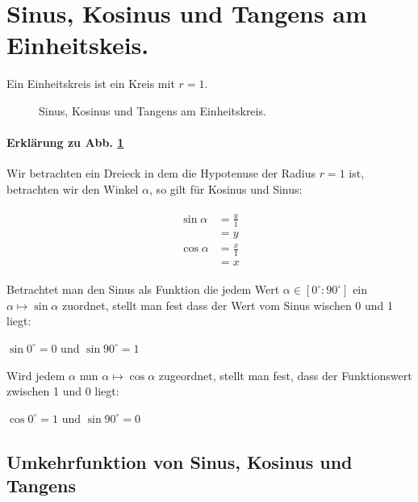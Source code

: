 \documentclass{report}
\theoremstyle{definition}
\theoremstyle{definition}
\theoremstyle{an}
\theoremstyle{lem}
\theoremstyle{def}
\theoremstyle{def}
\begin{document}
\section{Sinus, Kosinus und Tangens am Einheitskeis.}

\begin{defi}[Einheitskreis]
Ein Einheitskreis ist ein Kreis mit $r = 1$.
\end{defi}

\begin{figure}[h]
    \centering
    
    \caption{Sinus, Kosinus und Tangens am Einheitskreis.}
    \label{fig:62}
\end{figure}

\paragraph{\textsf{Erklärung zu Abb. \ref{fig:62}}}
Wir betrachten ein Dreieck in dem die Hypotenuse der Radius $r=1$ ist, betrachten wir den Winkel $\alpha$, so gilt für Kosinus und Sinus:

\begin{align}
    \begin{aligned}
    \sin \alpha &= \frac y1 \\ &= y \\
    \cos \alpha &= \frac{x}{1} \\ &= x
    \end{aligned}
\end{align}

Betrachtet man den Sinus als Funktion die jedem Wert $\alpha \in \left[ 0^\circ : 90^\circ \right]$ ein $\alpha \mapsto \sin \alpha$ zuordnet, stellt man fest dass der Wert vom Sinus wischen 0 und 1 liegt: \\ \begin{center}
    $\sin 0^\circ = 0$ und $\sin 90^\circ = 1$
\end{center}

Wird jedem $\alpha$ nun $\alpha \mapsto \cos \alpha$ zugeordnet, stellt man fest, dass der Funktionswert zwischen 1 und 0 liegt:
\\ \begin{center}
    $\cos 0^\circ = 1$ und $\sin 90^\circ = 0$
\end{center}

\subsection{Umkehrfunktion von Sinus, Kosinus und Tangens}
\end{document}
